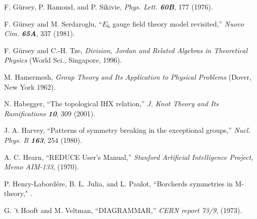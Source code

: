 F. G{\"u}rsey, P. Ramond, and P. Sikivie,
{\em Phys. Lett.  \bf 60B}, 177 (1976).

F. G{\"u}rsey and M. Serdaroglu,
``$E_6$ gauge field theory model revisited,''
{\em Nuovo Cim.    \bf 65A}, 337 (1981).

 F. G{\"u}rsey and C.-H. Tze,
    {\em Division, Jordan and Related Algebras in Theoretical Physics}
    (World Sci., Singapore, 1996).



 M. Hamermesh,
{\em Group Theory and Its Application to Physical Problems}
(Dover, New York 1962).

 N. Habegger,
    ``The topological IHX relation,''
    {\em J. Knot Theory and Its Ramifications  \bf 10}, 309 (2001). %


%
%

 J. A. Harvey,
``Patterns of symmetry breaking in the  exceptional groups,''
{\em Nucl. Phys. B \bf 163}, 254 (1980).


 A. C. Hearn,
``REDUCE User's Manual,''
{\em Stanford Artificial Intelligence Project, Memo AIM-133}, (1970).

   P. Henry-Labord\'ere, B. L. Julia, and L. Paulot,
     ``Borcherds symmetries in M-theory,"
.

%
 G. 't Hooft and M. Veltman,
``DIAGRAMMAR,''
{\em CERN report 73/9}, (1973).

